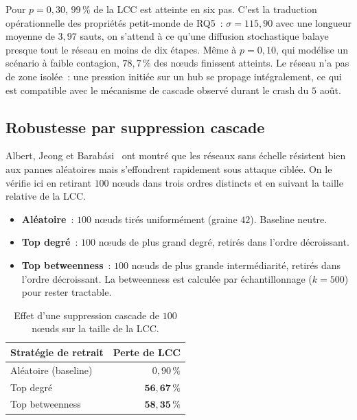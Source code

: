 Pour $p = 0{,}30$, $99\,\%$ de la LCC est atteinte en six pas. C'est la traduction op\'erationnelle des propri\'et\'es petit-monde de RQ5~: $\sigma = 115{,}90$ avec une longueur moyenne de $3{,}97$ sauts, on s'attend \`a ce qu'une diffusion stochastique balaye presque tout le r\'eseau en moins de dix \'etapes. M\^eme \`a $p = 0{,}10$, qui mod\'elise un sc\'enario \`a faible contagion, $78{,}7\,\%$ des n\oe{}uds finissent atteints. Le r\'eseau n'a pas de zone isol\'ee~: une pression initi\'ee sur un hub se propage int\'egralement, ce qui est compatible avec le m\'ecanisme de cascade observ\'e durant le crash du $5$ ao\^ut.

\subsection{Robustesse par suppression cascade}
\label{sec:complementaires_robustness}

Albert, Jeong et Barab\'asi~\cite{albert2000attacktolerance} ont montr\'e que les r\'eseaux sans \'echelle r\'esistent bien aux pannes al\'eatoires mais s'effondrent rapidement sous attaque cibl\'ee. On le v\'erifie ici en retirant $100$ n\oe{}uds dans trois ordres distincts et en suivant la taille relative de la LCC.

\begin{itemize}
  \item \textbf{Al\'eatoire}~: $100$ n\oe{}uds tir\'es uniform\'ement (graine $42$). Baseline neutre.
  \item \textbf{Top degr\'e}~: $100$ n\oe{}uds de plus grand degr\'e, retir\'es dans l'ordre d\'ecroissant.
  \item \textbf{Top betweenness}~: $100$ n\oe{}uds de plus grande interm\'ediarit\'e, retir\'es dans l'ordre d\'ecroissant. La betweenness est calcul\'ee par \'echantillonnage ($k = 500$) pour rester tractable.
\end{itemize}

\begin{table}[H]
\centering
\caption{Effet d'une suppression cascade de $100$ n\oe{}uds sur la taille de la LCC.}
\label{tab:extra_robustness}
\begin{tabular}{lr}
\toprule
Strat\'egie de retrait & Perte de LCC \\
\midrule
Al\'eatoire (baseline) & $0{,}90\,\%$ \\
Top degr\'e & $\mathbf{56{,}67\,\%}$ \\
Top betweenness & $\mathbf{58{,}35\,\%}$ \\
\bottomrule
\end{tabular}
\end{table}

